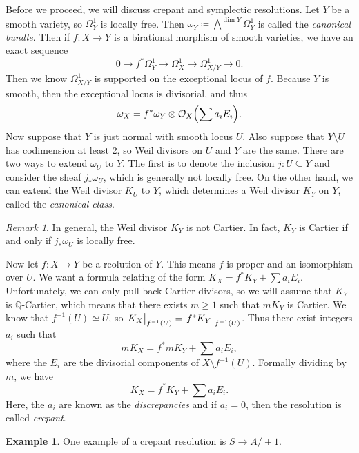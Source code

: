 \documentclass[leqno, openany]{memoir}
\theoremstyle{definition}
\newtheorem{exm}[thm]{Example}
\theoremstyle{remark}
\newtheorem{rmk}[thm]{Remark}
\theoremstyle{plain}
\theoremstyle{definition}
\theoremstyle{remark}
\newcommand{\Q}{\mathbb{Q}}
\newcommand{\mc}[1]{\mathcal{#1}}
\begin{document}
Before we proceed, we will discuss crepant and symplectic resolutions. Let $Y$ be a smooth variety, so $\Omega^1_Y$ is locally free. Then $\omega_Y \coloneqq \bigwedge^{\dim Y} \Omega^1_Y$ is called the \textit{canonical bundle}. Then if $f \colon X \to Y$ is a birational morphism of smooth varieties, we have an exact sequence
\[ 0 \to f^* \Omega^1_Y \to \Omega^1_X \to \Omega^1_{X/Y} \to 0. \]
Then we know $\Omega^1_{X/Y}$ is supported on the exceptional locus of $f$. Because $Y$ is smooth, then the exceptional locus is divisorial, and thus 
\[\omega_X = f^* \omega_Y \otimes \mc{O}_X\qty(\sum a_i E_i). \]
Now suppose that $Y$ is just normal with smooth locus $U$. Also suppose that $Y \setminus U$ has codimension at least $2$, so Weil divisors on $U$ and $Y$ are the same. There are two ways to extend $\omega_U$ to $Y$. The first is to denote the inclusion $j \colon U \subseteq Y$ and consider the sheaf $j_* \omega_U$, which is generally not locally free. On the other hand, we can extend the Weil divisor $K_U$ to $Y$, which determines a Weil divisor $K_Y$ on $Y$, called the \textit{canonical class}.

\begin{rmk}
    In general, the Weil divisor $K_Y$ is not Cartier. In fact, $K_Y$ is Cartier if and only if $j_* \omega_U$ is locally free.
\end{rmk}

Now let $f \colon X \to Y$ be a reolution of $Y$. This means $f$ is proper and an isomorphism over $U$. We want a formula relating of the form $K_X = f^* K_Y + \sum a_i E_i$. Unfortunately, we can only pull back Cartier divisors, so we will assume that $K_Y$ is $\Q$-Cartier, which means that there exists $m \geq 1$ such that $mK_Y$ is Cartier. We know that $f^{-1}(U) \simeq U$, so $\eval{K_X}_{f^{-1}(U)} = \eval{f^* K_Y}_{f^{-1}(U)}$. Thus there exist integers $a_i$ such that
\[ m K_X = f^* m K_Y + \sum a_i E_i, \]
where the $E_i$ are the divisorial components of $X \setminus f^{-1}(U)$. Formally dividing by $m$, we have
\[ K_X = f^* K_Y + \sum a_i E_i. \]
Here, the $a_i$ are known as the \textit{discrepancies} and if $a_i = 0$, then the resolution is called \textit{crepant}.

\begin{exm}
    One example of a crepant resolution is $S \to A / \pm 1$.
\end{exm}
\end{document}
